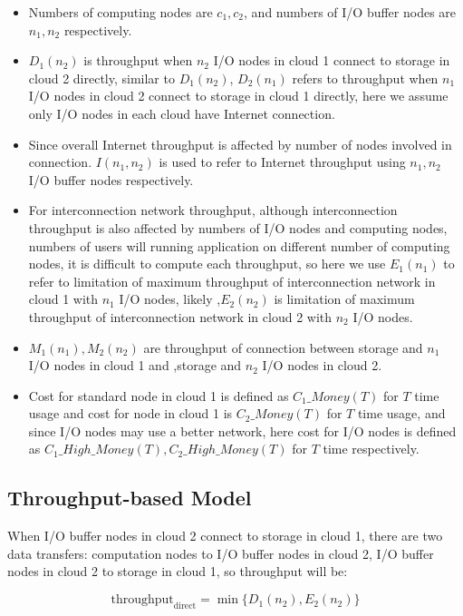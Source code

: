 \documentclass[JIP,draft]{ipsj}
\begin{document}
\begin{itemize}
	\item Numbers of computing nodes are $c_1,c_2$, and numbers of I/O buffer nodes are $n_1, n_2$ respectively.
	\item $D_1(n_2)$ is throughput when $n_2$ I/O nodes in cloud 1 connect to storage in cloud 2 directly, similar to $D_1(n_2)$, $D_2(n_1)$ refers to throughput when $n_1$ I/O nodes in cloud 2 connect to storage in cloud 1 directly, here we assume only I/O nodes in each cloud have Internet connection.
	\item Since overall Internet throughput is affected by number of nodes involved in connection. $I(n_1,n_2)$ is used to refer to Internet throughput using $n_1,n_2$ I/O buffer nodes respectively.
	\item For interconnection network throughput, although interconnection throughput is also affected by numbers of I/O nodes and computing nodes, numbers of users will running application on different number of computing nodes, it is difficult to compute each throughput, so here we use $E_1(n_1)$ to refer to limitation of maximum throughput of interconnection network in cloud 1 with $n_1$ I/O nodes, likely ,$E_2(n_2)$ is limitation of maximum throughput of interconnection network in cloud 2 with $n_2$ I/O nodes.
	\item $M_1(n_1),M_2(n_2)$ are throughput of connection between storage and $n_1$ I/O nodes in cloud 1 and ,storage and $n_2$ I/O nodes in cloud 2.
	\item Cost for standard node in cloud 1 is defined as $C_1\_Money(T)$ for $T$ time usage and cost for node in cloud 1 is $C_2\_Money(T)$ for $T$ time usage, and since I/O nodes may use a better network, here cost for I/O nodes is defined as $C_1\_High\_Money(T),C_2\_High\_Money(T)$ for $T$ time respectively.

\end{itemize}

\subsection{Throughput-based Model}
When I/O buffer nodes in cloud 2 connect to storage in cloud 1, there are two data transfers: computation nodes to I/O buffer nodes in cloud 2, I/O buffer nodes in cloud 2 to storage in cloud 1, so throughput will be:

\begin{equation}
	\text{throughput}_{\text{direct}}=\min\{D_1(n_2),E_2(n_2)\} \label{throughput1}
\end{equation}
\end{document}
